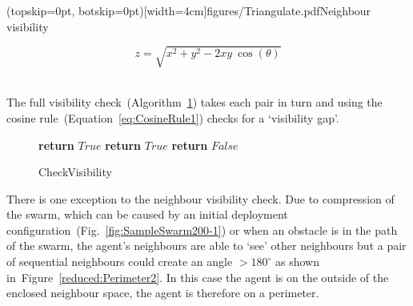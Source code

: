 \documentclass{ieeeaccess}
\begin{document}
\Figure[t!](topskip=0pt, botskip=0pt)[width=4cm]{figures/Triangulate.pdf}{Neighbour visibility\label{reduced:Triangulate}}

\begin{equation}\label{eq:CosineRule1}
z = \sqrt{x^2 + y^2 - 2xy~\cos(\theta)}
\end{equation}‎

The full visibility check~(Algorithm~\ref{algo:checkVisibility}) takes each pair in turn and using the cosine rule~(Equation~\ref{eq:CosineRule1}) checks for a `visibility gap'. 

\begin{figure}
\begin{algorithmic}[1]
			\State \textbf{return} $True$ 
   	\EndIf
		\State \textbf{return} $True$ 
	\EndIf
\EndFor
\State \textbf{return} $False$ 
\EndProcedure
\end{algorithmic}
\caption{CheckVisibility}
\label{algo:checkVisibility}
\end{figure}


There is one exception to the neighbour visibility check. Due to compression of the swarm, which can be caused by an initial deployment configuration~(Fig.~\ref{fig:SampleSwarm200-1}) or when an obstacle is in the path of the swarm, the agent's neighbours are able to `see' other neighbours but a pair of sequential neighbours could create an angle $> 180^\circ$ as shown in~Figure~\ref{reduced:Perimeter2}. In this case the agent is on the outside of the enclosed neighbour space, the agent is therefore on a perimeter. 

\end{document}
